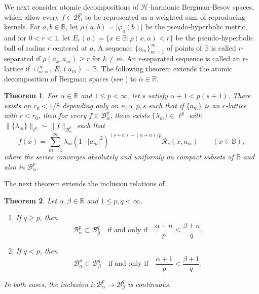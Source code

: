 \documentclass{amsart}
\newtheorem{theorem}{Theorem}[section]
\theoremstyle{definition}
\theoremstyle{remark}
\begin{document}
We next consider atomic decompositions of $\mathcal H$-harmonic
Bergman-Besov spaces, which allow every $f\in\mathcal B^p_\alpha$
to be represented as a weighted sum of reproducing kernels.
For $a,b\in\mathbb B$, let $\rho(a,b)=\vert\varphi_a(b)\vert$
be the pseudo-hyperbolic metric, and for $0<r<1$, let
$E_r(a)=\{x\in\mathbb B\colon\rho(x,a)<r\}$ be the pseudo-hyperbolic
ball of radius $r$ centered at $a$.
A sequence $\{a_m\}_{m=1}^\infty$ of points of $\mathbb B$ is called
$r$-separated if $\rho(a_k,a_m)\ge r$ for $k\neq m$.
An $r$-separated sequence is called an $r$-lattice if
$\cup_{m=1}^\infty E_r(a_m)=\mathbb B$.
The following theorem extends the atomic decomposition of Bergman spaces
(see \cite[Theorem 1.1 with Eqn.~(5)]{U2}) to $\alpha\in\mathbb R$.

\begin{theorem}\label{TAtomic}
For $\alpha\in\mathbb R$ and $1\le p<\infty$, let $s$ satisfy
$\alpha+1<p(s+1)$.
There exists an $r_0<1/8$ depending only on $n,\alpha,p,s$ such that
if $\{a_m\}$ is an $r$-lattice with $r<r_0$, then for every
$f\in\mathcal B^p_\alpha$, there exists $\{\lambda_m\}\in\ell^p$ with
$\|\{\lambda_m\}\|_{\ell^p}\sim\|f\|_{\mathcal B^p_\alpha}$ such that
\begin{equation*}
f(x)=\sum_{m=1}^\infty\lambda_m(1-\vert a_m\vert^2)^{(s+n)-(\alpha+n)/p}
\mathcal R_s(x,a_m)
\qquad (x\in\mathbb B),
\end{equation*}
where the series converges absolutely and uniformly on compact subsets
of $\mathbb B$ and also in $\mathcal B^p_\alpha$.
\end{theorem}

The next theorem extends the inclusion relations of \cite[Theorem 1.3]{U2}.

\begin{theorem}\label{TInclusion}
Let $\alpha,\beta\in\mathbb R$ and $1\le p,q<\infty$.
\begin{enumerate}
\item[(a)] If $q\geq p$, then
\begin{equation*}
  \mathcal B^p_\alpha\subset\mathcal B^q_\beta\quad
  \text{if and only if}\quad
  \frac{\alpha+n}{p}\leq\frac{\beta+n}{q}.
\end{equation*}
\item[(b)] If $q<p$, then
\begin{equation*}
  \mathcal B^p_\alpha\subset\mathcal B^q_\beta\quad
  \text{if and only if}\quad
  \frac{\alpha+1}{p}<\frac{\beta+1}{q}.
\end{equation*}
\end{enumerate}
In both cases, the inclusion
$i\colon\mathcal B^p_\alpha\to\mathcal B^q_\beta$ is continuous.
\end{theorem}
\end{document}
